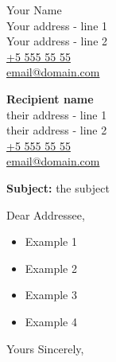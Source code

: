 \documentclass{letter}
\begin{document}
\begin{flushright}
Your Name\\
Your address - line 1\\
Your address - line 2\\
\href{tel:55555555}{+5 555 55 55}\\
\href{mailto:email@domain.com}{email@domain.com}
\end{flushright}

\vspace*{2\baselineskip}

\begin{flushleft}
\textbf{Recipient name}\\
their address - line 1\\
their address - line 2\\
\href{tel:55555555}{+5 555 55 55}\\
\href{mailto:email@domain.com}{email@domain.com}

\vspace*{4\baselineskip}

\textbf{Subject:} the subject 

\vspace*{2\baselineskip}


Dear Addressee,

\lipsum[1-2]
\begin{itemize}
	\item Example 1
	\item Example 2
	\item Example 3
	\item Example 4
\end{itemize}
\lipsum[4]
\vspace*{2\baselineskip}

\closing{Yours Sincerely,}

\end{flushleft}
\end{document}
